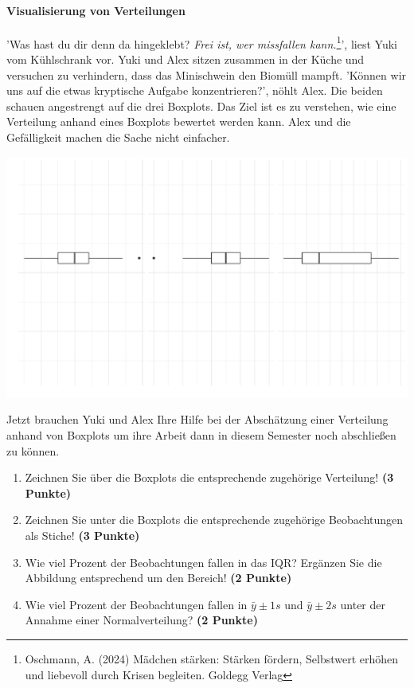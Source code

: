 \documentclass[a4paper, 9pt]{scrartcl}\usepackage[]{graphicx}\usepackage[]{xcolor}
\makeatletter
\def\maxwidth{ %
  \ifdim\Gin@nat@width>\linewidth
    \linewidth
  \else
    \Gin@nat@width
  \fi
}
\makeatother
\begin{document}
\paragraph{Visualisierung von Verteilungen}

'Was hast du dir denn da hingeklebt? \textit{Frei ist, wer missfallen kann.}\footnote{Oschmann, A. (2024) Mädchen stärken: Stärken fördern, Selbstwert erhöhen und liebevoll durch Krisen begleiten. Goldegg Verlag}', liest Yuki vom Kühlschrank vor. Yuki und Alex sitzen zusammen in der Küche und versuchen zu verhindern, dass das Minischwein den Biomüll mampft. 'Können wir uns auf die etwas kryptische Aufgabe konzentrieren?', nöhlt Alex. Die beiden schauen angestrengt auf die drei Boxplots. Das Ziel ist es zu verstehen, wie eine Verteilung anhand eines Boxplots bewertet werden kann. Alex und die Gefälligkeit machen die Sache nicht einfacher.



{\centering \includegraphics[width=\maxwidth]{img/desc-stat-11-1} 

}




Jetzt brauchen Yuki und Alex Ihre Hilfe bei der Abschätzung einer Verteilung anhand von Boxplots um ihre Arbeit dann in diesem Semester noch abschließen zu können.

\begin{enumerate}
\item Zeichnen Sie über die Boxplots die entsprechende zugehörige Verteilung! \textbf{(3 Punkte)} 
\item Zeichnen Sie unter die Boxplots die entsprechende zugehörige Beobachtungen als Stiche! \textbf{(3 Punkte)}
\item Wie viel Prozent der Beobachtungen fallen in das IQR? Ergänzen Sie die Abbildung entsprechend um den Bereich! \textbf{(2 Punkte)}
\item Wie viel Prozent der Beobachtungen fallen in $\bar{y} \pm 1s$ und $\bar{y} \pm 2s$  unter der Annahme einer Normalverteilung? \textbf{(2 Punkte)}
\end{enumerate} 
\clearpage
\end{document}
